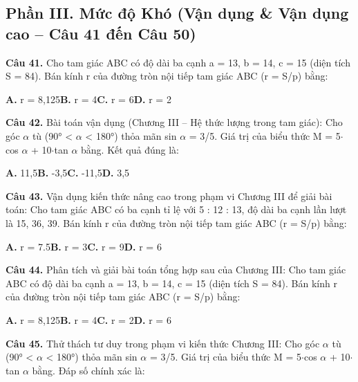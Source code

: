 \documentclass[11pt,a4paper]{article}
\begin{document}
\subsection*{\color{accent} Phần III. Mức độ Khó (Vận dụng \& Vận dụng cao -- Câu 41 đến Câu 50)}
\textbf{\color{primary} Câu 41.} Cho tam giác ABC có độ dài ba cạnh a = 13, b = 14, c = 15 (diện tích S = 84). Bán kính r của đường tròn nội tiếp tam giác ABC (r = S/p) bằng:\par
\hspace*{1.5em}\textbf{A.} r = 8,125\quad\quad \textbf{B.} r = 4\quad\quad \textbf{C.} r = 6\quad\quad \textbf{D.} r = 2\par\vspace{2pt}
\textbf{\color{primary} Câu 42.} Bài toán vận dụng (Chương III – Hệ thức lượng trong tam giác): Cho góc $\alpha$ tù (90° < $\alpha$ < 180°) thỏa mãn sin $\alpha$ = 3/5. Giá trị của biểu thức M = 5$\cdot$cos $\alpha$ + 10$\cdot$tan $\alpha$ bằng. Kết quả đúng là:\par
\hspace*{1.5em}\textbf{A.} 11,5\quad\quad \textbf{B.} -3,5\quad\quad \textbf{C.} -11,5\quad\quad \textbf{D.} 3,5\par\vspace{2pt}
\textbf{\color{primary} Câu 43.} Vận dụng kiến thức nâng cao trong phạm vi Chương III để giải bài toán: Cho tam giác ABC có ba cạnh tỉ lệ với 5 : 12 : 13, độ dài ba cạnh lần lượt là 15, 36, 39. Bán kính r của đường tròn nội tiếp tam giác ABC (r = S/p) bằng:\par
\hspace*{1.5em}\textbf{A.} r = 7.5\quad\quad \textbf{B.} r = 3\quad\quad \textbf{C.} r = 9\quad\quad \textbf{D.} r = 6\par\vspace{2pt}
\textbf{\color{primary} Câu 44.} Phân tích và giải bài toán tổng hợp sau của Chương III: Cho tam giác ABC có độ dài ba cạnh a = 13, b = 14, c = 15 (diện tích S = 84). Bán kính r của đường tròn nội tiếp tam giác ABC (r = S/p) bằng:\par
\hspace*{1.5em}\textbf{A.} r = 8,125\quad\quad \textbf{B.} r = 4\quad\quad \textbf{C.} r = 2\quad\quad \textbf{D.} r = 6\par\vspace{2pt}
\textbf{\color{primary} Câu 45.} Thử thách tư duy trong phạm vi kiến thức Chương III: Cho góc $\alpha$ tù (90° < $\alpha$ < 180°) thỏa mãn sin $\alpha$ = 3/5. Giá trị của biểu thức M = 5$\cdot$cos $\alpha$ + 10$\cdot$tan $\alpha$ bằng. Đáp số chính xác là:\par
\end{document}
